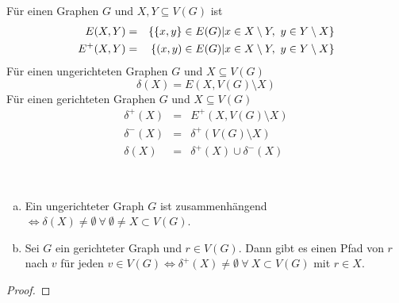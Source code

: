 	\begin{definition}
		Für einen Graphen $G$ und $X,Y\subseteq V(G)$ ist
		\begin{eqnarray*}
			E(X,Y) &=& \{\{x,y\}\in E(G)\vert x \in X\setminus Y,~y \in Y\setminus X\}\\
			E^+(X,Y) &=& \{(x,y)\in E(G)\vert x \in X\setminus Y,~y \in Y\setminus X\}
		\end{eqnarray*}
		Für einen ungerichteten Graphen $G$ und $X \subseteq V(G)$
		\begin{equation*}
			\delta(X) = E(X, V(G)\setminus X)
		\end{equation*}
		Für einen gerichteten Graphen $G$ und $X\subseteq V(G)$
		\begin{eqnarray*}
			\delta^+(X) &=& E^+(X, V(G)\setminus X)\\
			\delta^-(X) &=& \delta^+(V(G)\setminus X)\\
			\delta(X) &=& \delta^+(X) \cup \delta^-(X)
		\end{eqnarray*}
	\end{definition}
	\begin{lemma}~
		\begin{enumerate}[a)]
			\item Ein ungerichteter Graph $G$ ist zusammenhängend $\Leftrightarrow \delta(X) \neq \emptyset~ \forall ~\emptyset \neq X \subset V(G)$.
			\item Sei $G$ ein gerichteter Graph und $r \in V(G)$. Dann gibt es einen Pfad von $r$ nach $v$ für jeden $v \in V(G) \Leftrightarrow \delta^+(X) \neq \emptyset~\forall~X\subset V(G)$ mit $r\in X$.
		\end{enumerate}
	\end{lemma}
	\begin{proof}
		
	\end{proof}
	